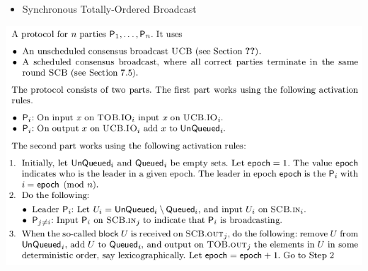 \documentclass[11pt]{article}
\begin{document}
\begin{itemize}
\item Synchronous Totally-Ordered Broadcast
\end{itemize}
\begin{center}
\includegraphics[width=.9\linewidth]{State Machine Replication (10)/screenshot_2018-10-21_10-36-00.png}
\end{center}
\end{document}
